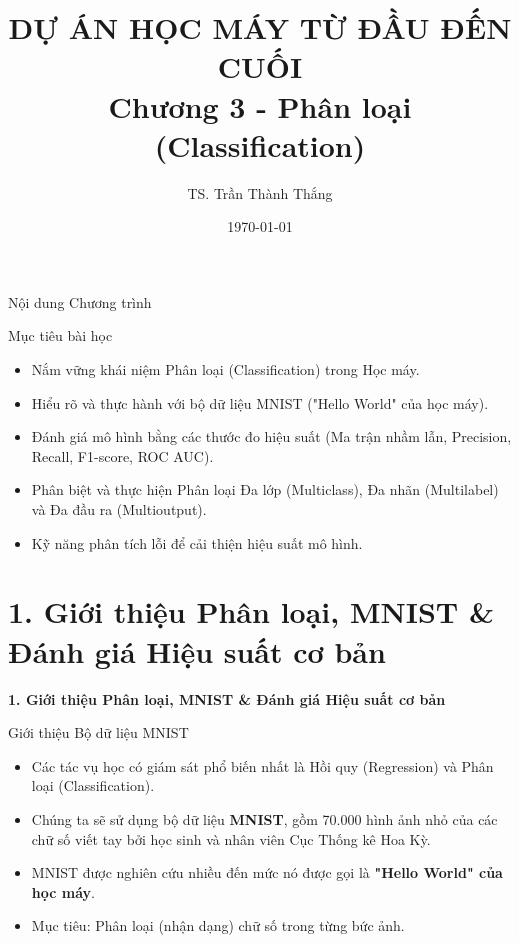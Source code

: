 \documentclass[aspectratio=169]{beamer}
\title[Chương 3: Phân loại]{DỰ ÁN HỌC MÁY TỪ ĐẦU ĐẾN CUỐI \\ \vspace{0.5cm} \Large Chương 3 - Phân loại (Classification)}
\author{TS. Trần Thành Thắng}
\institute{Đại học Đông Á}
\date{\today}
\begin{document}
\begin{frame}
\titlepage
\end{frame}

\begin{frame}{Nội dung Chương trình}
\tableofcontents[hideallsubsections]
\end{frame}

\begin{frame}{Mục tiêu bài học}
\begin{itemize}
    \item Nắm vững khái niệm Phân loại (Classification) trong Học máy.
    \item Hiểu rõ và thực hành với bộ dữ liệu MNIST ("Hello World" của học máy).
    \item Đánh giá mô hình bằng các thước đo hiệu suất (Ma trận nhầm lẫn, Precision, Recall, F1-score, ROC AUC).
    \item Phân biệt và thực hiện Phân loại Đa lớp (Multiclass), Đa nhãn (Multilabel) và Đa đầu ra (Multioutput).
    \item Kỹ năng phân tích lỗi để cải thiện hiệu suất mô hình.
\end{itemize}
\end{frame}

\section{1. Giới thiệu Phân loại, MNIST \& Đánh giá Hiệu suất cơ bản}

\begin{frame}
\vfill\centering\LARGE\textbf{1. Giới thiệu Phân loại, MNIST \& Đánh giá Hiệu suất cơ bản}\vfill
\end{frame}

\begin{frame}{Giới thiệu Bộ dữ liệu MNIST}
\begin{itemize}
    \item Các tác vụ học có giám sát phổ biến nhất là Hồi quy (Regression) và Phân loại (Classification).
    \item Chúng ta sẽ sử dụng bộ dữ liệu \textbf{MNIST}, gồm 70.000 hình ảnh nhỏ của các chữ số viết tay bởi học sinh và nhân viên Cục Thống kê Hoa Kỳ.
    \item MNIST được nghiên cứu nhiều đến mức nó được gọi là \textbf{"Hello World" của học máy}.
    \item Mục tiêu: Phân loại (nhận dạng) chữ số trong từng bức ảnh.
\end{itemize}
\end{frame}
\end{document}
